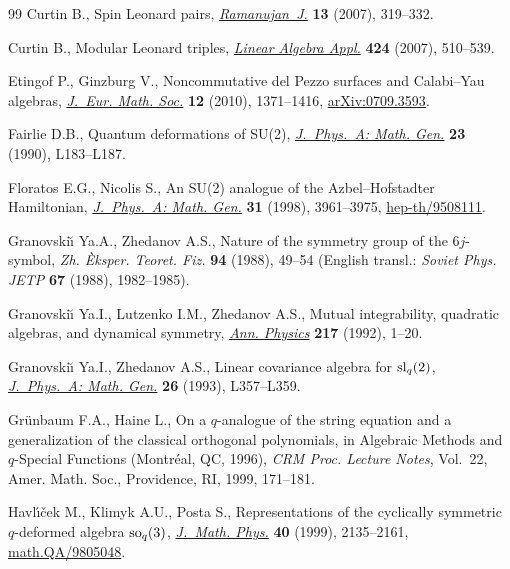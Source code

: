 \documentclass[pdftex]{sigma}
\numberwithin{equation}{section}
\begin{document}
\begin{thebibliography}{99}
 Curtin B.,
Spin Leonard pairs,
\href{http://dx.doi.org/10.1007/s11139-006-0255-z}{{\it Ramanujan~J.}} {\bf 13} (2007), 319--332.


Curtin B.,
Modular Leonard triples,
\href{http://dx.doi.org/10.1016/j.laa.2007.02.024}{{\it Linear Algebra Appl.}} {\bf 424} (2007), 510--539.


Etingof P., Ginzburg V.,
Noncommutative del Pezzo surfaces and Calabi--Yau algebras,
\href{http://dx.doi.org/10.4171/JEMS/235}{{\it J.~Eur. Math. Soc.}} {\bf 12} (2010), 1371--1416,
\href{http://arxiv.org/abs/0709.3593}{arXiv:0709.3593}.




Fairlie D.B.,
Quantum deformations of SU(2),
\href{http://dx.doi.org/10.1088/0305-4470/23/5/001}{{\it J.~Phys.~A: Math. Gen.}} {\bf 23} (1990), L183--L187.


Floratos E.G., Nicolis S.,
An SU(2) analogue of the Azbel--Hofstadter Hamiltonian,
\href{http://dx.doi.org/10.1088/0305-4470/31/17/007}{{\it J.~Phys.~A: Math. Gen.}} {\bf 31} (1998), 3961--3975,
\href{http://arxiv.org/abs/hep-th/9508111}{hep-th/9508111}.

Granovski{\u\i} Ya.A., Zhedanov A.S.,
Nature of the symmetry group of the $6j$-symbol,
{\it Zh. \`Eksper. Teoret. Fiz.}  {\bf 94} (1988), 49--54 (English transl.: {\it Soviet Phys. JETP} {\bf 67} (1988), 1982--1985).

Granovski{\u\i} Ya.I., Lutzenko I.M.,  Zhedanov  A.S.,
Mutual integrability, quadratic algebras, and dynamical symmetry,
\href{http://dx.doi.org/10.1016/0003-4916(92)90336-K}{{\it Ann. Physics}} {\bf 217} (1992), 1--20.


  Granovski{\u\i} Ya.I., Zhedanov A.S.,
Linear covariance algebra for ${\rm {s}{l}}\sb q(2)$,
\href{http://dx.doi.org/10.1088/0305-4470/26/7/001}{{\it J.~Phys.~A: Math. Gen.}} {\bf 26} (1993), L357--L359.


Gr{\"u}nbaum  F.A., Haine L.,
On a $q$-analogue of the string equation and a generalization of the classical orthogonal polynomials,
 in Algebraic Methods and $q$-Special Functions (Montr\'eal, QC, 1996),
{\it CRM Proc. Lecture Notes}, Vol.~22, Amer. Math. Soc., Providence, RI, 1999, 171--181.

Havl{\'{\i}}{\v{c}}ek M., Klimyk A.U., Posta S.,
Representations of the cyclically symmetric $q$-deformed algebra ${\rm so}_q (3)$,
\href{http://dx.doi.org/10.1063/1.532856}{{\it J.~Math. Phys.}} {\bf 40} (1999), 2135--2161,
\href{http://arxiv.org/abs/math.QA/9805048}{math.QA/9805048}.


\end{thebibliography}
\end{document}

